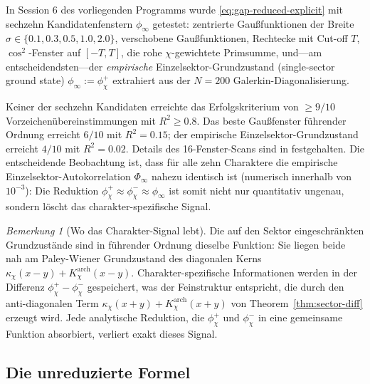 \documentclass[10pt,twocolumn]{article}
\theoremstyle{definition}
\theoremstyle{remark}
\newtheorem{remark}[theorem]{Bemerkung}
\newcommand{\chifn}{\chi}
\begin{document}
In Session 6 des vorliegenden Programms wurde \eqref{eq:gap-reduced-explicit}
mit sechzehn Kandidatenfenstern $\phi_\infty$ getestet: zentrierte Gaußfunktionen der
Breite $\sigma\in\{0.1,0.3,0.5,1.0,2.0\}$, verschobene Gaußfunktionen, Rechtecke
mit Cut-off $T$, $\cos^2$-Fenster auf $[-T,T]$, die rohe
$\chifn$-gewichtete Primsumme, und---am entscheidendsten---der \emph{empirische}
Einzelsektor-Grundzustand (single-sector ground state)
$\phi_\infty:=\phi_{\chifn}^+$ extrahiert aus der $N=200$ Galerkin-Diagonalisierung.

Keiner der sechzehn Kandidaten erreichte das Erfolgskriterium von
$\geq\!9/10$ Vorzeichenübereinstimmungen mit $R^2\geq 0.8$. Das beste
Gaußfenster führender Ordnung erreicht $6/10$ mit $R^2=0.15$; der
empirische Einzelsektor-Grundzustand erreicht $4/10$ mit
$R^2=0.02$. Details des 16-Fenster-Scans sind in
\cite{Woche4Validation} festgehalten. Die entscheidende Beobachtung ist, dass für alle
zehn Charaktere die empirische Einzelsektor-Autokorrelation
$\Phi_\infty$ nahezu identisch ist (numerisch innerhalb von $10^{-3}$):
Die Reduktion $\phi_{\chifn}^+\approx\phi_{\chifn}^-\approx
\phi_\infty$ ist somit nicht nur quantitativ ungenau, sondern
löscht das charakter-spezifische Signal.

\begin{remark}[Wo das Charakter-Signal lebt]
\label{rem:signal-locus}
Die auf den Sektor eingeschränkten Grundzustände sind in führender Ordnung dieselbe
Funktion: Sie liegen beide nah am Paley-Wiener Grundzustand des
diagonalen Kerns $\kappa_{\chifn}(x-y)+K^{\mathrm{arch}}_{\chifn}
(x-y)$. Charakter-spezifische Informationen werden in der Differenz
$\phi_{\chifn}^+-\phi_{\chifn}^-$ gespeichert, was der Feinstruktur
entspricht, die durch den anti-diagonalen Term $\kappa_{\chifn}(x+y)+
K^{\mathrm{arch}}_{\chifn}(x+y)$ von Theorem~\ref{thm:sector-diff} erzeugt wird.
Jede analytische Reduktion, die $\phi_{\chifn}^+$ und
$\phi_{\chifn}^-$ in eine gemeinsame Funktion absorbiert, verliert exakt dieses Signal.
\end{remark}

\subsection{Die unreduzierte Formel}
\label{sec:formula-unreduced}
\end{document}
